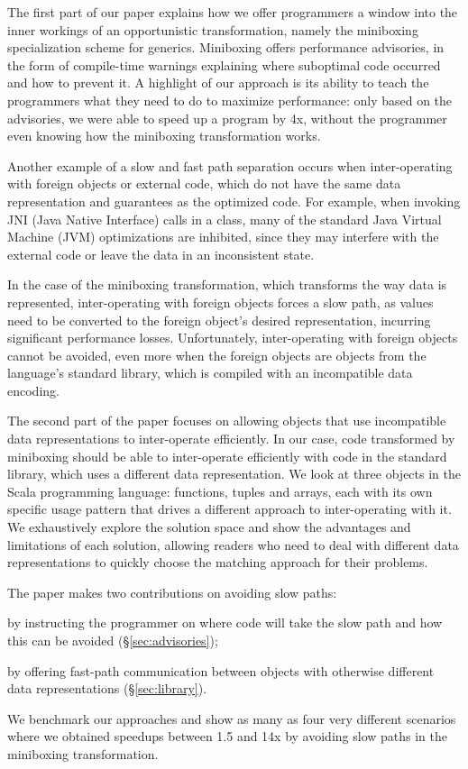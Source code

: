 The first part of our paper explains how we offer programmers a window into the inner workings of an opportunistic transformation, namely the miniboxing specialization scheme for generics. Miniboxing offers performance advisories, in the form of compile-time warnings explaining where suboptimal code occurred and how to prevent it. A highlight of our approach is its ability to teach the programmers what they need to do to maximize performance: only based on the advisories, we were able to speed up a program by 4x, without the programmer even knowing how the miniboxing transformation works.

Another example of a slow and fast path separation occurs when inter-operating with foreign objects or external code, which do not have the same data representation and guarantees as the optimized code. For example, when invoking JNI (Java Native Interface) calls in a class, many of the standard Java Virtual Machine (JVM) optimizations are inhibited, since they may interfere with the external code or leave the data in an inconsistent state.

In the case of the miniboxing transformation, which transforms the way data is represented, inter-operating with foreign objects forces a slow path, as values need to be converted to the foreign object's desired representation, incurring significant performance losses. Unfortunately, inter-operating with foreign objects cannot be avoided, even more when the foreign objects are objects from the language's standard library, which is compiled with an incompatible data encoding.

The second part of the paper focuses on allowing objects that use incompatible data representations to inter-operate efficiently. In our case, code transformed by miniboxing should be able to inter-operate efficiently with code in the standard library, which uses a different data representation. We look at three objects in the Scala programming language: functions, tuples and arrays, each with its own specific usage pattern that drives a different approach to inter-operating with it. We exhaustively explore the solution space and show the advantages and limitations of each solution, allowing readers who need to deal with different data representations to quickly choose the matching approach for their problems.

The paper makes two contributions on avoiding slow paths:
\begin{compactitem}
  \item by instructing the programmer on where code will take the slow path and how this can be avoided (\S\ref{sec:advisories});
  \item by offering fast-path communication between objects with otherwise different data representations (\S\ref{sec:library}).
\end{compactitem}

We benchmark our approaches and show as many as four very different scenarios where we obtained speedups between 1.5 and 14x by avoiding slow paths in the miniboxing transformation.
